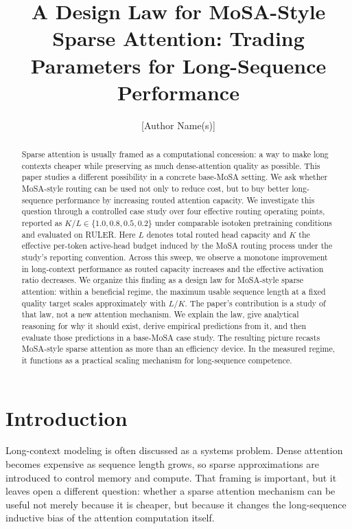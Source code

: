 \documentclass[11pt]{article}
\title{A Design Law for MoSA-Style Sparse Attention: Trading Parameters for Long-Sequence Performance}
\author{[Author Name(s)]}
\date{}
\begin{document}
\maketitle

\begin{abstract}
Sparse attention is usually framed as a computational concession: a way to make long contexts cheaper while preserving as much dense-attention quality as possible. This paper studies a different possibility in a concrete base-MoSA setting. We ask whether MoSA-style routing can be used not only to reduce cost, but to buy better long-sequence performance by increasing routed attention capacity. We investigate this question through a controlled case study over four effective routing operating points, reported as $K/L \in \{1.0, 0.8, 0.5, 0.2\}$ under comparable isotoken pretraining conditions and evaluated on RULER. Here $L$ denotes total routed head capacity and $K$ the effective per-token active-head budget induced by the MoSA routing process under the study's reporting convention. Across this sweep, we observe a monotone improvement in long-context performance as routed capacity increases and the effective activation ratio decreases. We organize this finding as a design law for MoSA-style sparse attention: within a beneficial regime, the maximum usable sequence length at a fixed quality target scales approximately with $L/K$. The paper's contribution is a study of that law, not a new attention mechanism. We explain the law, give analytical reasoning for why it should exist, derive empirical predictions from it, and then evaluate those predictions in a base-MoSA case study. The resulting picture recasts MoSA-style sparse attention as more than an efficiency device. In the measured regime, it functions as a practical scaling mechanism for long-sequence competence.
\end{abstract}

\section{Introduction}

Long-context modeling is often discussed as a systems problem. Dense attention becomes expensive as sequence length grows, so sparse approximations are introduced to control memory and compute. That framing is important, but it leaves open a different question: whether a sparse attention mechanism can be useful not merely because it is cheaper, but because it changes the long-sequence inductive bias of the attention computation itself.
\end{document}
